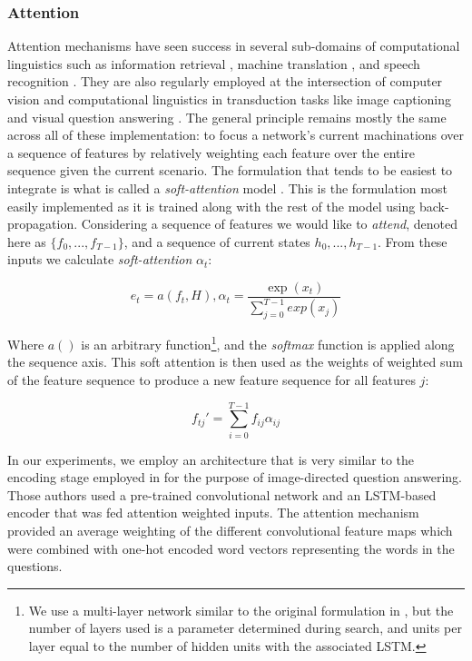 \documentclass[utf8]{frontiersSCNS} %
\begin{document}
\subsubsection{Attention}


Attention mechanisms have seen success in several sub-domains of computational linguistics such as information retrieval \cite{Moritz}, machine translation \cite{machine_translation}, and speech recognition \cite{Bahdanau}. They are also regularly employed at the intersection of computer vision and computational linguistics in transduction tasks like image captioning \cite{XuKELVINXU, etc.} and visual question answering \cite{}. The general principle remains mostly the same across all of these implementation: to focus a network's current machinations over a sequence of features by relatively weighting each feature over the entire sequence given the current scenario. The formulation that tends to be easiest to integrate is what is called a \emph{soft-attention} model \cite{XuKELVINXU}. This is the formulation most easily implemented as it is trained along with the rest of the model using back-propagation. Considering a sequence of features we would like to \emph{attend}, denoted here as $\{f_0, ..., f_{T-1}\}$, and a sequence of current states ${h_0,...,h_{T-1}}$. From these inputs we calculate \emph{soft-attention} $\alpha_t$: 

\begin{equation} \label{eq:attn_nrg}
  e_{t} = a(f_{t}, H) , \alpha_t =  \frac{\exp(x_{t})}{\sum_{j=0}^{T-1}exp(x_{j})}
\end{equation}

Where $a()$ is an arbitrary function\footnote{We use a multi-layer network similar to the original formulation in \cite{XuKELVINXU}, but the number of layers used is a parameter determined during search, and units per layer equal to the number of hidden units with the associated LSTM.}, and the \emph{softmax} function is applied along the sequence axis. This soft attention is then used as the weights of weighted sum of the feature sequence to produce a new feature sequence for all features $j$: 

\begin{equation} \label{eq:attn}
    f_{tj}' = \sum_{i=0}^{T-1} f_{ij} \alpha_{ij}
  \end{equation}

In our experiments, we employ an architecture that is very similar to the encoding stage employed in \cite{Zhu} for the purpose of image-directed question answering. Those authors used a pre-trained convolutional network and an LSTM-based encoder that was fed attention weighted inputs. The attention mechanism provided an average weighting of the different convolutional feature maps which were combined with one-hot encoded word vectors representing the words in the questions.
\end{document}
